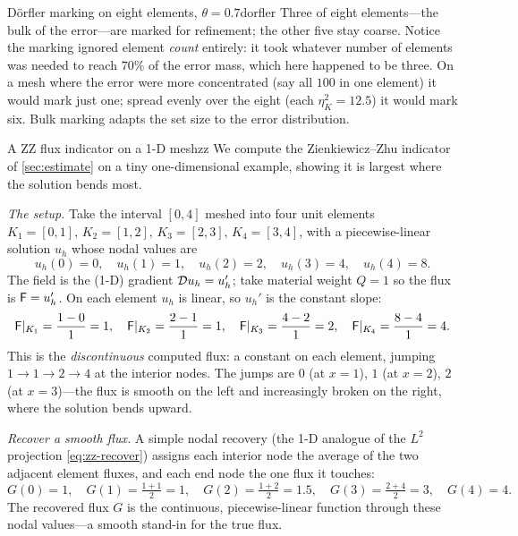 \begin{workedexample}{D\"orfler marking on eight elements, $\theta = 0.7$}{dorfler}
Three of eight elements---the bulk of the error---are marked for refinement; the other
five stay coarse. Notice the marking ignored element \emph{count} entirely: it took
whatever number of elements was needed to reach $70\%$ of the error mass, which here
happened to be three. On a mesh where the error were more concentrated (say all $100$
in one element) it would mark just one; spread evenly over the eight (each
$\eta_K^2 = 12.5$) it would mark six. Bulk marking adapts the set size to the
error distribution.
\end{workedexample}

\begin{workedexample}{A ZZ flux indicator on a 1-D mesh}{zz}
\label{wex:zz}
We compute the Zienkiewicz--Zhu indicator of \cref{sec:estimate} on a tiny
one-dimensional example, showing it is largest where the solution bends most.

\emph{The setup.} Take the interval $[0,4]$ meshed into four unit elements
$K_1=[0,1],\,K_2=[1,2],\,K_3=[2,3],\,K_4=[3,4]$, with a piecewise-linear solution
$u_h$ whose nodal values are
\[
u_h(0)=0,\quad u_h(1)=1,\quad u_h(2)=2,\quad u_h(3)=4,\quad u_h(4)=8.
\]
The field is the (1-D) gradient $\mathcal{D} u_h = u_h'$; take material weight $Q=1$ so
the flux is $\mathsf{F} = u_h'$. On each element $u_h$ is linear, so $u_h'$ is the
constant slope:
\[
\mathsf{F}|_{K_1}=\frac{1-0}{1}=1,\quad
\mathsf{F}|_{K_2}=\frac{2-1}{1}=1,\quad
\mathsf{F}|_{K_3}=\frac{4-2}{1}=2,\quad
\mathsf{F}|_{K_4}=\frac{8-4}{1}=4.
\]
This is the \emph{discontinuous} computed flux: a constant on each element, jumping
$1\!\to\!1\!\to\!2\!\to\!4$ at the interior nodes. The jumps are $0$ (at $x=1$), $1$
(at $x=2$), $2$ (at $x=3$)---the flux is smooth on the left and increasingly broken
on the right, where the solution bends upward.

\emph{Recover a smooth flux.} A simple nodal recovery (the 1-D analogue of the $L^2$
projection \cref{eq:zz-recover}) assigns each interior node the average of the two
adjacent element fluxes, and each end node the one flux it touches:
\[
G(0)=1,\quad
G(1)=\tfrac{1+1}{2}=1,\quad
G(2)=\tfrac{1+2}{2}=1.5,\quad
G(3)=\tfrac{2+4}{2}=3,\quad
G(4)=4.
\]
The recovered flux $G$ is the continuous, piecewise-linear function through these
nodal values---a smooth stand-in for the true flux.


\end{workedexample}
